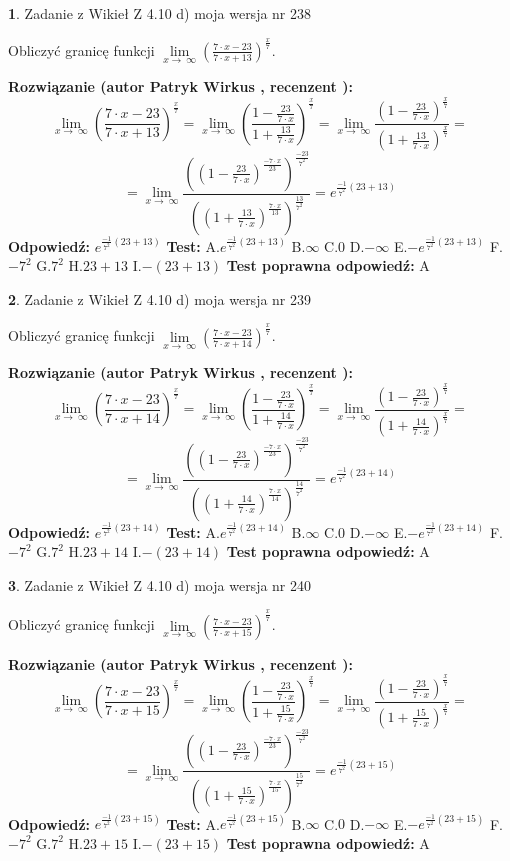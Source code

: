 \documentclass[12pt, a4paper]{article}
\theoremstyle{definition} %
\newtheorem{zad}{}
\newcommand{\zadStart}[1]{\begin{zad}#1\newline}
\newcommand{\zadStop}{\end{zad}}
\newcommand{\rozwStart}[2]{\noindent \textbf{Rozwiązanie (autor #1 , recenzent #2): }\newline}
\newcommand{\rozwStop}{\newline}
\newcommand{\odpStart}{\noindent \textbf{Odpowiedź:}\newline}
\newcommand{\odpStop}{\newline}
\newcommand{\testStart}{\noindent \textbf{Test:}\newline}
\newcommand{\testStop}{\newline}
\newcommand{\kluczStart}{\noindent \textbf{Test poprawna odpowiedź:}\newline}
\newcommand{\kluczStop}{\newline}
\begin{document}
\zadStart{Zadanie z Wikieł Z 4.10 d) moja wersja nr 238}


Obliczyć granicę funkcji  $\lim\limits_{x\to\ \infty}(\frac{7\cdot x-23}{7\cdot x+13})^{\frac{x}{7}}$.
\zadStop
\rozwStart{Patryk Wirkus}{}
$$\lim\limits_{x\to\ \infty}(\frac{7\cdot x-23}{7\cdot x+13})^{\frac{x}{7}} = \lim\limits_{x\to\ \infty}(\frac{1-\frac{23}{7\cdot x}}{1+\frac{13}{7\cdot x}})^{\frac{x}{7}}=\lim\limits_{x\to\ \infty}\frac{(1-\frac{23}{7\cdot x})^{\frac{x}{7}}}{(1+\frac{13}{7\cdot x})^{\frac{x}{7}}}=$$
$$=\lim\limits_{x\to\ \infty}\frac{((1-\frac{23}{7\cdot x})^{\frac{-7\cdot x}{23}})^{\frac{-23}{7^{2}}}}{((1+\frac{13}{7\cdot x})^{\frac{7\cdot x}{13}})^{\frac{13}{7^{2}}}}=e^{\frac{-1}{7^{2}}(23+13)}$$
\rozwStop
\odpStart
$e^{\frac{-1}{7^{2}}(23+13)}$
\odpStop
\testStart
A.$e^{\frac{-1}{7^{2}}(23+13)}$ B.$\infty$ C.$0$ D.$-\infty$ E.$-e^{\frac{-1}{7^{2}}(23+13)}$
F.$-7^{2}$ G.$7^{2}$
H.$23+13$
I.$-(23+13)$
\testStop
\kluczStart
A
\kluczStop



\zadStart{Zadanie z Wikieł Z 4.10 d) moja wersja nr 239}


Obliczyć granicę funkcji  $\lim\limits_{x\to\ \infty}(\frac{7\cdot x-23}{7\cdot x+14})^{\frac{x}{7}}$.
\zadStop
\rozwStart{Patryk Wirkus}{}
$$\lim\limits_{x\to\ \infty}(\frac{7\cdot x-23}{7\cdot x+14})^{\frac{x}{7}} = \lim\limits_{x\to\ \infty}(\frac{1-\frac{23}{7\cdot x}}{1+\frac{14}{7\cdot x}})^{\frac{x}{7}}=\lim\limits_{x\to\ \infty}\frac{(1-\frac{23}{7\cdot x})^{\frac{x}{7}}}{(1+\frac{14}{7\cdot x})^{\frac{x}{7}}}=$$
$$=\lim\limits_{x\to\ \infty}\frac{((1-\frac{23}{7\cdot x})^{\frac{-7\cdot x}{23}})^{\frac{-23}{7^{2}}}}{((1+\frac{14}{7\cdot x})^{\frac{7\cdot x}{14}})^{\frac{14}{7^{2}}}}=e^{\frac{-1}{7^{2}}(23+14)}$$
\rozwStop
\odpStart
$e^{\frac{-1}{7^{2}}(23+14)}$
\odpStop
\testStart
A.$e^{\frac{-1}{7^{2}}(23+14)}$ B.$\infty$ C.$0$ D.$-\infty$ E.$-e^{\frac{-1}{7^{2}}(23+14)}$
F.$-7^{2}$ G.$7^{2}$
H.$23+14$
I.$-(23+14)$
\testStop
\kluczStart
A
\kluczStop



\zadStart{Zadanie z Wikieł Z 4.10 d) moja wersja nr 240}


Obliczyć granicę funkcji  $\lim\limits_{x\to\ \infty}(\frac{7\cdot x-23}{7\cdot x+15})^{\frac{x}{7}}$.
\zadStop
\rozwStart{Patryk Wirkus}{}
$$\lim\limits_{x\to\ \infty}(\frac{7\cdot x-23}{7\cdot x+15})^{\frac{x}{7}} = \lim\limits_{x\to\ \infty}(\frac{1-\frac{23}{7\cdot x}}{1+\frac{15}{7\cdot x}})^{\frac{x}{7}}=\lim\limits_{x\to\ \infty}\frac{(1-\frac{23}{7\cdot x})^{\frac{x}{7}}}{(1+\frac{15}{7\cdot x})^{\frac{x}{7}}}=$$
$$=\lim\limits_{x\to\ \infty}\frac{((1-\frac{23}{7\cdot x})^{\frac{-7\cdot x}{23}})^{\frac{-23}{7^{2}}}}{((1+\frac{15}{7\cdot x})^{\frac{7\cdot x}{15}})^{\frac{15}{7^{2}}}}=e^{\frac{-1}{7^{2}}(23+15)}$$
\rozwStop
\odpStart
$e^{\frac{-1}{7^{2}}(23+15)}$
\odpStop
\testStart
A.$e^{\frac{-1}{7^{2}}(23+15)}$ B.$\infty$ C.$0$ D.$-\infty$ E.$-e^{\frac{-1}{7^{2}}(23+15)}$
F.$-7^{2}$ G.$7^{2}$
H.$23+15$
I.$-(23+15)$
\testStop
\kluczStart
A
\kluczStop
\end{document}
